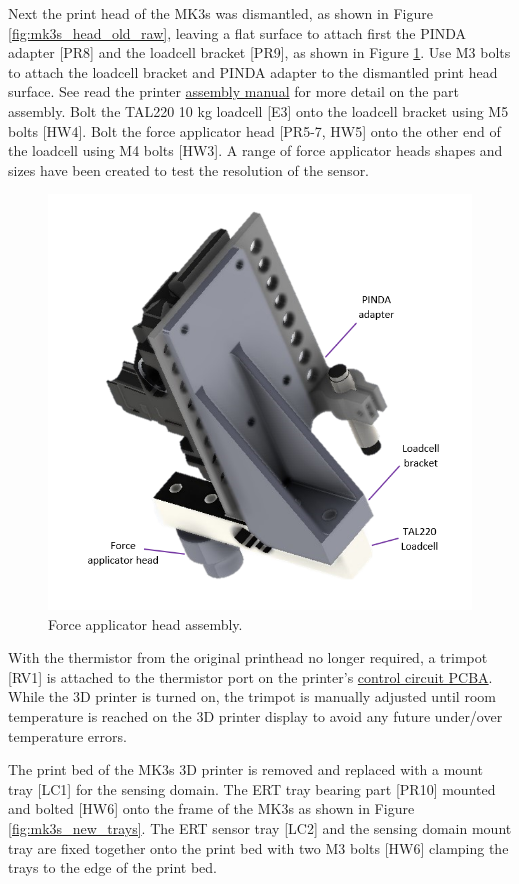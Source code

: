 Next the print head of the MK3s was dismantled, as shown in Figure \ref{fig:mk3s_head_old_raw}, leaving a flat surface to attach first the PINDA adapter [PR8] and the loadcell bracket [PR9], as shown in Figure \ref{fig:mk3s_head_new}. Use M3 bolts to attach the loadcell bracket and PINDA adapter to the dismantled print head surface. See read the printer \href{https://help.prusa3d.com/guide/5-e-axis-assembly_169235#170079}{assembly manual} for more detail on the part assembly\cite{Prusa2023}. Bolt the TAL220 10 kg loadcell [E3] onto the loadcell bracket using M5 bolts [HW4]. Bolt the force applicator head [PR5-7, HW5] onto the other end of the loadcell using M4 bolts [HW3]. A range of force applicator heads shapes and sizes have been created to test the resolution of the sensor. 
\begin{figure}[H]
\centering
\includegraphics[width=0.5\linewidth]{Figures/modded_MK3s_print_head_clean_labelled.png}
\caption{Force applicator head assembly.}
\label{fig:mk3s_head_new}
\end{figure}
With the thermistor from the original printhead no longer required, a trimpot [RV1] is attached to the thermistor port on the printer's \href{https://help.prusa3d.com/guide/8-electronics-assembly_174100#175539}{control circuit PCBA}\cite{Prusa2023a}. While the 3D printer is turned on, the trimpot is manually adjusted until room temperature is reached on the 3D printer display to avoid any future under/over temperature errors.

The print bed of the MK3s 3D printer is removed and replaced with a mount tray [LC1] for the sensing domain. The ERT tray bearing part [PR10] mounted and bolted [HW6] onto the frame of the MK3s as shown in Figure \ref{fig:mk3s_new_trays}. The ERT sensor tray [LC2] and the sensing domain mount tray are fixed together onto the print bed with two M3 bolts [HW6] clamping the trays to the edge of the print bed.

